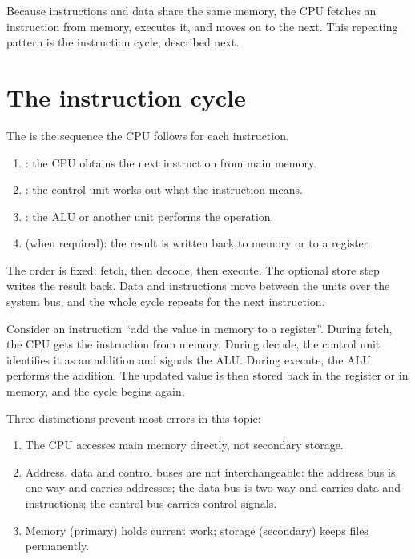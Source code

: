 Because instructions and data share the same memory, the CPU fetches an
instruction from memory, executes it, and moves on to the next. This repeating
pattern is the instruction cycle, described next.

\section{The instruction cycle}
The  is the sequence the CPU follows for each
instruction.

\begin{enumerate}
  \item {}: the CPU obtains the next instruction from main memory.
  \item {}: the control unit works out what the instruction means.
  \item {}: the ALU or another unit performs the operation.
  \item {} (when required): the result is written back to memory or
    to a register.
\end{enumerate}

The order is fixed: fetch, then decode, then execute. The optional store step
writes the result back. Data and instructions move between the units over the
system bus, and the whole cycle repeats for the next instruction.

\begin{example}
Consider an instruction ``add the value in memory to a register''. During
fetch, the CPU gets the instruction from memory. During decode, the control
unit identifies it as an addition and signals the ALU. During execute, the ALU
performs the addition. The updated value is then stored back in the register
or in memory, and the cycle begins again.
\end{example}

Three distinctions prevent most errors in this topic:
\begin{enumerate}
  \item The CPU accesses main memory directly, not secondary storage.
  \item Address, data and control buses are not interchangeable: the address
    bus is one-way and carries addresses; the data bus is two-way and carries
    data and instructions; the control bus carries control signals.
  \item Memory (primary) holds current work; storage (secondary) keeps files
    permanently.
\end{enumerate}

